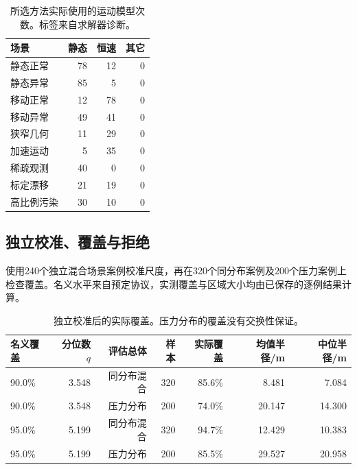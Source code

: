 \begin{table}[H]\centering\small
\caption{所选方法实际使用的运动模型次数。标签来自求解器诊断。}

\begin{tabular}{lrrr}
\toprule
场景 & 静态 & 恒速 & 其它\\
\midrule
静态正常 & 78 & 12 & 0\\
静态异常 & 85 & 5 & 0\\
移动正常 & 12 & 78 & 0\\
移动异常 & 49 & 41 & 0\\
狭窄几何 & 11 & 29 & 0\\
加速运动 & 5 & 35 & 0\\
稀疏观测 & 40 & 0 & 0\\
标定漂移 & 21 & 19 & 0\\
高比例污染 & 30 & 10 & 0\\
\bottomrule\end{tabular}\end{table}

\subsection{独立校准、覆盖与拒绝}

使用240个独立混合场景案例校准尺度，再在320个同分布案例及200个压力案例上检查覆盖。名义水平来自预定协议，实测覆盖与区域大小均由已保存的逐例结果计算。

\begin{table}[H]\centering\small
\caption{独立校准后的实际覆盖。压力分布的覆盖没有交换性保证。}

\begin{tabular}{lrrrrrr}
\toprule
名义覆盖 & 分位数$q$ & 评估总体 & 样本 & 实际覆盖 & 均值半径/m & 中位半径/m\\
\midrule
90.0\% & 3.548 & 同分布混合 & 320 & 85.6\% & 8.481 & 7.084\\
90.0\% & 3.548 & 压力分布 & 200 & 74.0\% & 20.147 & 14.300\\
95.0\% & 5.199 & 同分布混合 & 320 & 94.7\% & 12.429 & 10.383\\
95.0\% & 5.199 & 压力分布 & 200 & 85.5\% & 29.527 & 20.958\\
\bottomrule\end{tabular}\end{table}

